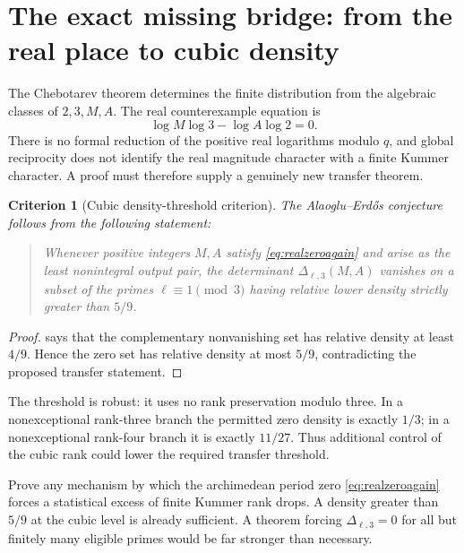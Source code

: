 \documentclass[11pt]{article}
\numberwithin{equation}{section}
\newtheorem{criterion}[theorem]{Criterion}
\theoremstyle{definition}
\theoremstyle{remark}
\begin{document}
\section{The exact missing bridge: from the real place to cubic density}
\label{sec:bridge}

The Chebotarev theorem determines the finite distribution from the algebraic classes of
\(2,3,M,A\).  The real counterexample equation is
\begin{equation}
 \log M\log3-\log A\log2=0.\label{eq:realzeroagain}
\end{equation}
There is no formal reduction of the positive real logarithms modulo \(q\), and global
reciprocity does not identify the real magnitude character with a finite Kummer character.
A proof must therefore supply a genuinely new transfer theorem.

\begin{criterion}[Cubic density-threshold criterion]
\label{crit:threshold}
The Alaoglu--Erd\H{o}s conjecture follows from the following statement:

\begin{quote}
Whenever positive integers \(M,A\) satisfy \eqref{eq:realzeroagain} and arise as the least
nonintegral output pair, the determinant \(\Delta_{\ell,3}(M,A)\) vanishes on a subset of the
primes \(\ell\equiv1\pmod3\) having relative lower density strictly greater than \(5/9\).
\end{quote}
\end{criterion}

\begin{proof}
 says that the complementary nonvanishing set has relative density at
least \(4/9\).  Hence the zero set has relative density at most \(5/9\), contradicting the
proposed transfer statement.
\end{proof}

The threshold is robust: it uses no rank preservation modulo three.  In a nonexceptional
rank-three branch the permitted zero density is exactly \(1/3\); in a nonexceptional
rank-four branch it is exactly \(11/27\).  Thus additional control of the cubic rank could
lower the required transfer threshold.

\begin{gapbox}
Prove any mechanism by which the archimedean period zero \eqref{eq:realzeroagain} forces a
statistical excess of finite Kummer rank drops.  A density greater than \(5/9\) at the cubic
level is already sufficient.  A theorem forcing \(\Delta_{\ell,3}=0\) for all but finitely
many eligible primes would be far stronger than necessary.
\end{gapbox}
\end{document}
